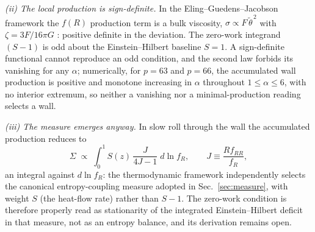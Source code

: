 \documentclass[aps,prd,twocolumn,superscriptaddress,nofootinbib,longbibliography]{revtex4-2}
\begin{document}
\emph{(ii) The local production is sign-definite.} In the
Eling--Guedens--Jacobson framework the $f(R)$ production term is a bulk
viscosity, $\sigma\propto F\,\tilde\theta^{\,2}$ with
$\zeta=3F/16\pi G$ \cite{EGJ2006,ChircoLiberati2010}: positive definite in
the deviation. The zero-work integrand $(S-1)$ is odd about the
Einstein--Hilbert baseline $S=1$. A sign-definite functional cannot
reproduce an odd condition, and the second law forbids its vanishing for
any $\alpha$; numerically, for $p=63$ and $p=66$, the accumulated wall
production is positive and monotone increasing in $\alpha$ throughout
$1\le\alpha\le6$, with no interior extremum, so neither a vanishing nor a
minimal-production reading selects a wall.

\emph{(iii) The measure emerges anyway.} In slow roll through the wall the
accumulated production reduces to
\begin{equation}
\Sigma\;\propto\;\int_0^1 S(z)\,\frac{J}{4J-1}\;d\ln f_R,
\qquad J\equiv\frac{Rf_{RR}}{f_R},
\end{equation}
an integral against $d\ln f_R$: the thermodynamic framework independently
selects the canonical entropy-coupling measure adopted in
Sec.~\ref{sec:measure}, with weight $S$ (the heat-flow rate) rather than
$S-1$. The zero-work condition is therefore properly read as stationarity
of the integrated Einstein--Hilbert deficit in that measure, not as an
entropy balance, and its derivation remains open.



\end{document}
